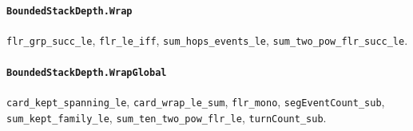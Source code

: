 \paragraph{\texttt{BoundedStackDepth.Wrap}}
{\small\raggedright \texttt{flr\_grp\_succ\_le}, \texttt{flr\_le\_iff}, \texttt{sum\_hops\_events\_le}, \texttt{sum\_two\_pow\_flr\_succ\_le}.\par}

\paragraph{\texttt{BoundedStackDepth.WrapGlobal}}
{\small\raggedright \texttt{card\_kept\_spanning\_le}, \texttt{card\_wrap\_le\_sum}, \texttt{flr\_mono}, \texttt{segEventCount\_sub}, \texttt{sum\_kept\_family\_le}, \texttt{sum\_ten\_two\_pow\_flr\_le}, \texttt{turnCount\_sub}.\par}
